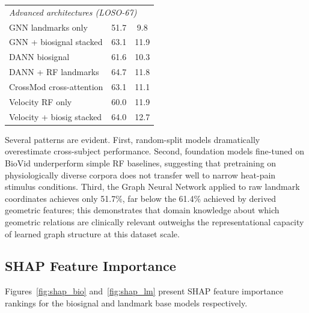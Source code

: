 \documentclass[10pt, twocolumn]{article}
\begin{document}
\begin{table}[t]
\begin{tabular}{lcc}
\midrule
\multicolumn{3}{l}{\textit{Advanced architectures (LOSO-67)}} \\
GNN landmarks only        & 51.7 & 9.8 \\
GNN + biosignal stacked   & 63.1 & 11.9 \\
DANN biosignal            & 61.6 & 10.3 \\
DANN + RF landmarks       & 64.7 & 11.8 \\
CrossMod cross-attention  & 63.1 & 11.1 \\
Velocity RF only          & 60.0 & 11.9 \\
Velocity + biosig stacked & 64.0 & 12.7 \\
\bottomrule
\end{tabular}
\end{table}

Several patterns are evident. First, random-split models dramatically overestimate
cross-subject performance. Second, foundation models fine-tuned on BioVid underperform
simple RF baselines, suggesting that pretraining on physiologically diverse corpora does
not transfer well to narrow heat-pain stimulus conditions. Third, the Graph Neural Network
applied to raw landmark coordinates achieves only 51.7\%, far below the 61.4\% achieved
by derived geometric features; this demonstrates that domain knowledge about which
geometric relations are clinically relevant outweighs the representational capacity of
learned graph structure at this dataset scale.

\subsection{SHAP Feature Importance}

Figures~\ref{fig:shap_bio} and~\ref{fig:shap_lm} present SHAP feature importance rankings
for the biosignal and landmark base models respectively.
\end{document}
